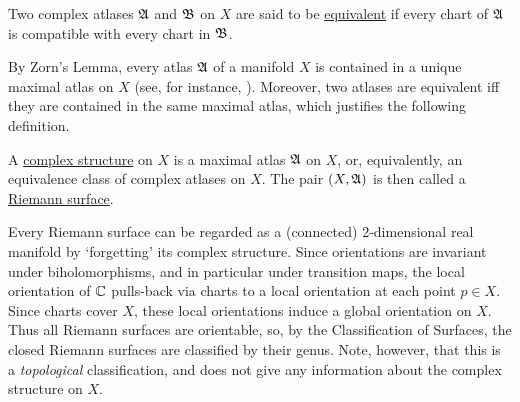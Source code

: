 \documentclass[../Moduli_Spaces_of_Riemann_Surfaces.tex]{subfiles}
\begin{document}
    \begin{definition}
        Two complex atlases $\mathfrak{A}$ and $\mathfrak{B}$ on $X$ are said to be \ul{equivalent} if every chart of $\mathfrak{A}$ is compatible with every chart in $\mathfrak{B}$.
    \end{definition}
    \begin{remark}
        By Zorn's Lemma, every atlas $\mathfrak{A}$ of a manifold $X$ is contained in a unique maximal atlas on $X$ (see, for instance, \cite[][Proposition 1.17]{leeSM}). Moreover, two atlases are equivalent iff they are contained in the same maximal atlas, which justifies the following definition.\exqed
    \end{remark}
    \begin{definition}
        A \ul{complex structure} on $X$ is a  maximal atlas $\mathfrak{A}$ on $X$, or, equivalently, an equivalence class of complex atlases on $X$. The pair $\left(X,\mathfrak{A}\right)$ is then called a \ul{Riemann surface}.
    \end{definition}
    \begin{remark}
        Every Riemann surface can be regarded as a (connected) $2$-dimensional real manifold by $\textrm{`}$forgetting$\textrm{'}$ its complex structure. Since orientations are invariant under biholomorphisms, and in particular under transition maps, the local orientation of $\mathbb{C}$ pulls-back via charts to a local orientation at each point $p\in X$. Since charts cover $X$, these local orientations induce a global orientation on $X$. Thus all Riemann surfaces are orientable, so, by the Classification of Surfaces, the closed Riemann surfaces are classified by their genus. Note, however, that this is a \textit{topological} classification, and does not give any information about the complex structure on $X$.\exqed
    \end{remark}
\end{document}
